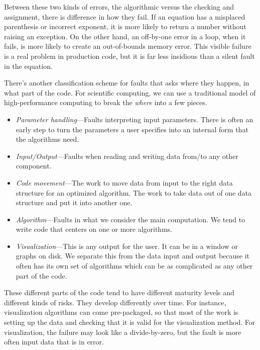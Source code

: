 \documentclass[fleqn,10pt]{olplainarticle}
\begin{document}
Between these two kinds of errors, the algorithmic versus the
checking and assignment, there is difference in how they fail.
If an equation has a misplaced parenthesis or incorrect exponent,
it is more likely to return a number without raising an exception.
On the other hand, an off-by-one error in a loop, when it fails,
is more likely to create an out-of-bounds memory error. This visible
failure is a real problem in production code, but it is far
less insidious than a silent fault in the equation.

There's another classification scheme for faults that asks
where they happen, in what part of the code. For scientific computing,
we can use a traditional model of high-performance computing
to break the \emph{where} into a few pieces.
\begin{itemize}
    \item \emph{Parameter handling}---Faults interpreting input parameters.
    There is often an early step to turn the parameters a user specifies
    into an internal form that the algorithms need.

    \item \emph{Input/Output}---Faults when reading and writing
    data from/to any other component.

    \item \emph{Code movement}---The work to move data from input
    to the right data structure for an optimized algorithm. The work
    to take data out of one data structure and put it into another one.

    \item \emph{Algorithm}---Faults in what we consider the main
    computation. We tend to write code that centers on one
    or more algorithms.

    \item \emph{Visualization}---This is any output for the user. It
    can be in a window or graphs on disk. We separate this from the
    data input and output because it often has its own set of
    algorithms which can be as complicated as any other part of the code.
\end{itemize}
These different parts of the code tend to have different maturity levels
and different kinds of risks. They develop differently over time.
For instance, visualization algorithms can come pre-packaged, so that
most of the work is setting up the data and checking that it is valid
for the visualization method. For visualization, the failure may look
like a divide-by-zero, but the fault is more often input data that
is in error.
\end{document}
